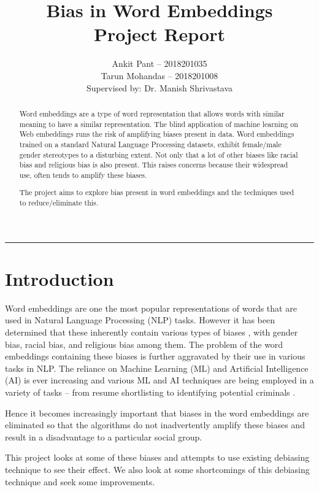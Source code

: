\documentclass[12pt, a4paper]{article}
\title{\Huge{Bias in Word Embeddings}\\ \vspace{2mm} \Large{Project Report}}
\author{Ankit Pant -- 2018201035 \\ Tarun Mohandas -- 2018201008 \\
	Supervised by: Dr. Manish Shrivastava}
\date{}
\begin{document}
	\maketitle
	\thispagestyle{empty}
	\noindent\rule{\textwidth}{1pt}
	\newpage
	\setcounter{page}{1}
	\begin{abstract}
		Word embeddings are a type of word representation that allows words with similar meaning to have a similar representation. The blind application of machine learning on Web embeddings runs the risk of amplifying biases present in data. Word embeddings trained on a standard Natural Language Processing datasets, exhibit female/male gender stereotypes to a disturbing extent. Not only that a lot of other biases like racial bias and religious bias is also present. This raises concerns because their widespread use, often tends to amplify these biases.
		\par The project aims to explore bias present in word embeddings and the techniques used to reduce/eliminate this. 	\end{abstract}
	\newpage
	
	\tableofcontents
	\newpage
	
	\setcounter{page}{1}
	
	\section{Introduction}
		Word embeddings are one the most popular representations of words that are used in Natural Language Processing (NLP) tasks. However it has been determined that these inherently contain various types of biases \cite{5,6}, with gender bias, racial bias, and religious bias among them. The problem of the word embeddings containing these biases is further aggravated by their use in various tasks in NLP. The reliance on Machine Learning (ML) and Artificial Intelligence (AI) is ever increasing and various ML and AI techniques are being employed in a variety of tasks -- from resume shortlisting to identifying potential criminals \cite{7}. 
		\par Hence it becomes increasingly important that biases in the word embeddings are eliminated so that the algorithms do not inadvertently amplify these biases and result in a disadvantage to a particular social group.
		\par This project looks at some of these biases and attempts to use existing debiasing technique to see their effect. We also look at some shortcomings of this debiasing technique  \cite{1} and seek some improvements. 
\end{document}
